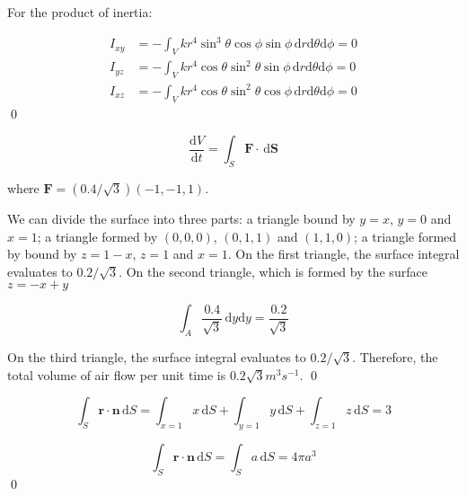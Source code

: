 \documentclass[12pt]{article}
\begin{document}
For the product of inertia:

\begin{equation}
\begin{split}
    I_{xy} &= -\int_{V} k r^{4} \sin^{3}{\theta} \cos{\phi} \sin{\phi} \, \mathrm{d}r \mathrm{d}\theta \mathrm{d}\phi = 0 \\
    I_{yz} &= -\int_{V} k r^{4} \cos{\theta} \sin^{2}{\theta} \sin{\phi} \, \mathrm{d}r \mathrm{d}\theta \mathrm{d}\phi = 0 \\
    I_{xz} &= -\int_{V} k r^{4} \cos{\theta} \sin^{2}{\theta} \cos{\phi} \, \mathrm{d}r \mathrm{d}\theta \mathrm{d}\phi = 0
\end{split}
\end{equation}
\qed



\begin{equation}
    \frac{\mathrm{d}V}{\mathrm{d}t} = \int_{S} \mathbf{F} \cdot \, \mathrm{d}\mathbf{S}
\end{equation}

where $\mathbf{F} = (0.4/\sqrt{3}) (-1, -1, 1)$.

We can divide the surface into three parts: a triangle bound by $y = x$, $y = 0$ and $x = 1$; a triangle formed by $(0, 0,0)$, $(0, 1, 1)$ and $(1, 1, 0)$; a triangle formed by bound by $z = 1 - x$, $z = 1$ and $x = 1$. On the first triangle, the surface integral evaluates to $0.2/\sqrt{3}$. On the second triangle, which is formed by the surface $z = -x + y$

\begin{equation}
    \int_{A} \frac{0.4}{\sqrt{3}} \, \mathrm{d}y \mathrm{d}y = \frac{0.2}{\sqrt{3}}
\end{equation}

On the third triangle, the surface integral evaluates to $0.2/\sqrt{3}$. Therefore, the total volume of air flow per unit time is $0.2 \sqrt{3} \unit{m^{3}s^{-1}}$.
\qed




\begin{equation}
    \int_{S} \mathbf{r} \cdot \mathbf{n} \, \mathrm{d}S = \int_{x=1} x \, \mathrm{d}S + \int_{y=1} y \, \mathrm{d}S + \int_{z=1} z \, \mathrm{d}S = 3
\end{equation}


\begin{equation}
    \int_{S} \mathbf{r} \cdot \mathbf{n} \, \mathrm{d}S = \int_{S} a \, \mathrm{d}S = 4\pi a^{3}
\end{equation}
\qed
\end{document}
